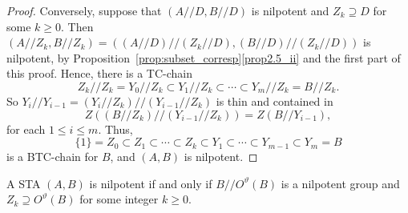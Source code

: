 \documentclass[ALCO,ThmDefs,Unicode,epreuves]{cedram}
\begin{document}
\begin{proof}
Conversely, suppose that $(A//D, B//D)$ is nilpotent and $Z_k \supseteq
D$ for some $k \geq 0$. Then 
$(A//Z_k, B//Z_k) = ((A//D)//(Z_k//D), (B//D)//(Z_k//D))$ is nilpotent,
by Proposition~\ref{prop:subset_corresp}\ref{prop2.5_ii} and the first part of this
proof. Hence, there is a TC-chain
\[
Z_k//Z_k = Y_0//Z_k \subset Y_1//Z_k \subset \cdots \subset Y_m//Z_k =
B//Z_k.
\]
So $Y_i//Y_{i-1} = (Y_i//Z_k)//(Y_{i-1}//Z_k)$ is thin
and contained in 
\[
Z((B//Z_k)//(Y_{i-1}//Z_k)) = Z(B//Y_{i-1}),
\]
 for each
$1 \leq i \leq m$. Thus,
\[
\{1\} = Z_0 \subset Z_1 \subset \cdots \subset Z_k \subset Y_1 \subset
\cdots \subset Y_{m-1} \subset Y_m = B
\]
is a BTC-chain for $B$, and $(A, B)$ is nilpotent. 
\end{proof}
 
\begin{coro}
\label{cor:nilp_group}
A STA $(A, B)$ is nilpotent if and only if $B//O^{\vartheta}(B)$ is a
nilpotent group and $Z_k \supseteq O^{\vartheta}(B)$ for some integer $k
\geq 0$.
\end{coro}
\end{document}
